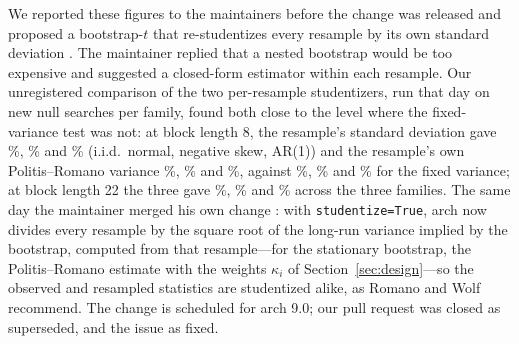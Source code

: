 We reported these figures to the maintainers before the change was released \citep{arch879} and proposed a bootstrap-$t$ that re-studentizes every resample by its own standard deviation \citep{arch881}. The maintainer replied that a nested bootstrap would be too expensive and suggested a closed-form estimator within each resample. Our unregistered comparison of the two per-resample studentizers, run that day on  new null searches per family, found both close to the level where the fixed-variance test was not: at block length 8, the resample's standard deviation gave \%, \% and \% (i.i.d.\ normal, negative skew, AR(1)) and the resample's own Politis--Romano variance \%, \% and \%, against \%, \% and \% for the fixed variance; at block length 22 the three gave \%, \% and \% across the three families. The same day the maintainer merged his own change \citep{arch882}: with \texttt{studentize=True}, arch now divides every resample by the square root of the long-run variance implied by the bootstrap, computed from that resample---for the stationary bootstrap, the Politis--Romano estimate with the weights $\kappa_i$ of Section~\ref{sec:design}---so the observed and resampled statistics are studentized alike, as Romano and Wolf recommend. The change is scheduled for arch 9.0; our pull request was closed as superseded, and the issue as fixed.

